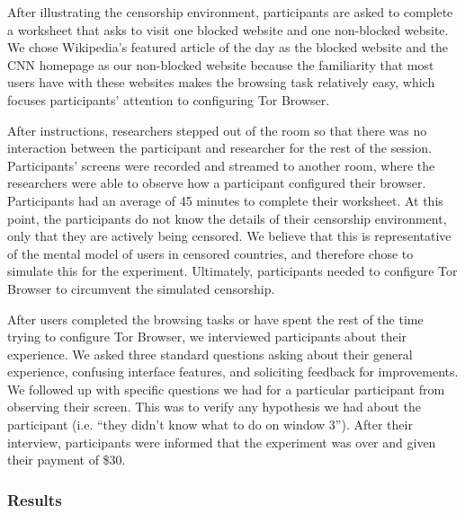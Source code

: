 \documentclass{template}
\begin{document}
After illustrating the censorship environment, participants are asked to 
complete a worksheet that asks to visit one blocked website and one non-blocked website. 
We chose Wikipedia's featured article of the day as the blocked website and 
the CNN homepage as our non-blocked website because the familiarity 
that most users have with these websites makes the browsing task relatively easy, 
which focuses participants' attention to configuring Tor Browser. 

After instructions, researchers stepped out of the room so that there was no interaction
between the participant and researcher for the rest of the session. Participants' screens 
were recorded and streamed to another room, where the researchers were able to 
observe how a participant configured their browser. Participants had an 
average of 45 minutes to complete their worksheet. 
At this point, the participants do not know the details of their censorship environment,
only that they are actively being censored. We believe that this is representative 
of the mental model of users in censored countries, and therefore chose to simulate 
this for the experiment. Ultimately, participants needed to configure Tor Browser to 
circumvent the simulated censorship. 

After users completed the browsing tasks or have spent the rest of the time
trying to configure Tor Browser, we interviewed participants about their experience.
We asked three standard questions asking about their general experience, 
confusing interface features, and soliciting feedback for improvements. We followed up
with specific questions we had for a particular participant from observing their screen. 
This was to verify any hypothesis we had about the participant (i.e. ``they didn't know what to do on window 3'').  
After their interview, participants were informed that the experiment was over and 
given their payment of \$30. 

\subsubsection{Results} 

\end{document}
